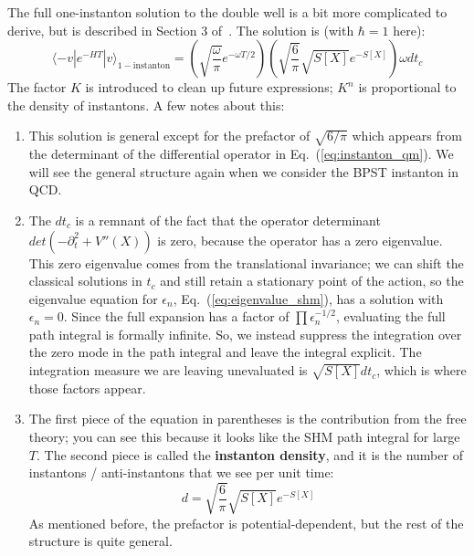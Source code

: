\documentclass[11pt, oneside]{article}   	%
\theoremstyle{definition}
\begin{document}
The full one-instanton solution to the double well is a bit more complicated to derive, but is described in Section 3 of~\cite{instanton_abc}. 
The solution is (with $\hbar = 1$ here):
\begin{equation}
	\langle -v | e^{-HT} | v\rangle_\mathrm{1-instanton} = \left(\sqrt{\frac{\omega}{\pi}} e^{-\omega T / 2}\right)\left(\sqrt{\frac{6}{\pi}}\sqrt{S[X]} e^{-S[X]}\right) \omega dt_c
\end{equation}
The factor $K$ is introduced to clean up future expressions; $K^n$ is proportional to the density of instantons. A few notes about this:
\begin{enumerate}
	\item This solution is general except for the prefactor of $\sqrt{6 / \pi}$ which appears from the determinant of the differential operator in 
	Eq.~(\ref{eq:instanton_qm}). We will see the general structure again when we consider the BPST instanton in QCD. 
	\item The $dt_c$ is a remnant of the fact that the operator determinant $det(-\partial_t^2 + V''(X))$ is zero, because the operator has a 
	zero eigenvalue. This zero eigenvalue comes from the translational invariance; we can shift the classical solutions in $t_c$ and still 
	retain a stationary point of the action, so the eigenvalue equation for $\epsilon_n$, Eq.~(\ref{eq:eigenvalue_shm}), has a solution with 
	$\epsilon_n = 0$. Since the full expansion has a factor of $\prod \epsilon_n^{-1/2}$, evaluating the full path integral is formally infinite. 
	So, we instead suppress the integration over the zero mode in the path integral and leave the integral explicit. The integration measure 
	we are leaving unevaluated is $\sqrt{S[X]} dt_c$, which is where those factors appear. 
	\item The first piece of the equation in parentheses is the contribution from the free theory; you can see this because it looks like the 
	SHM path integral for large $T$. The second piece is called the \textbf{instanton density}, and it is the number of instantons / 
	anti-instantons that we see per unit time:
	\begin{equation}
		d = \sqrt{\frac{6}{\pi}}\sqrt{S[X]} e^{-S[X]}
	\end{equation}
	As mentioned before, the prefactor is potential-dependent, but the rest of the structure is quite general. 
\end{enumerate}
\end{document}
